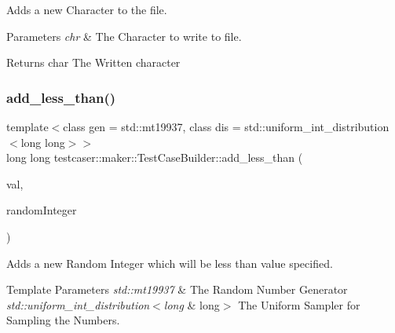 Adds a new Character to the file. 


\begin{DoxyParams}{Parameters}
{\em chr} & The Character to write to file. \\
\hline
\end{DoxyParams}
\begin{DoxyReturn}{Returns}
char The Written character 
\end{DoxyReturn}
\mbox{\label{classtestcaser_1_1maker_1_1TestCaseBuilder_a6649b1f108aae10780562876df58a5b2}} 
\subsubsection{\texorpdfstring{add\_less\_than()}{add\_less\_than()}\hspace{0.1cm}{\footnotesize\ttfamily [1/2]}}
{\footnotesize\ttfamily template$<$class gen  = std\+::mt19937, class dis  = std\+::uniform\+\_\+int\+\_\+distribution$<$long long$>$$>$ \\
long long testcaser\+::maker\+::\+Test\+Case\+Builder\+::add\+\_\+less\+\_\+than (\begin{DoxyParamCaption}\item[{long long}]{val,  }\item[{\mbox{\hyperlink{classtestcaser_1_1maker_1_1types_1_1RandomInteger}{types\+::\+Random\+Integer}}$<$ gen, dis $>$ \&}]{random\+Integer }\end{DoxyParamCaption})\hspace{0.3cm}{\ttfamily [inline]}}



Adds a new Random Integer which will be less than value specified. 


\begin{DoxyTemplParams}{Template Parameters}
{\em std\+::mt19937} & The Random Number Generator \\
\hline
{\em std\+::uniform\+\_\+int\+\_\+distribution$<$long} & long$>$ The Uniform Sampler for Sampling the Numbers. \\
\hline
\end{DoxyTemplParams}

